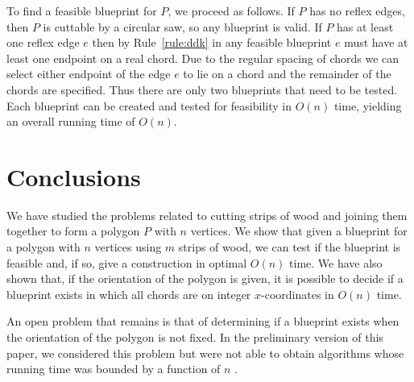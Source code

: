 \documentclass{elsart}
\begin{document}
To find a feasible blueprint for $P$, we proceed as follows.  If $P$
has no reflex edges, then $P$ is cuttable by a circular saw, so any
blueprint is valid.  If $P$ has at least one reflex edge $e$ then by
Rule~\ref{rule:ddk} in any feasible blueprint $e$ must have at least
one endpoint on a real chord.  Due to the regular spacing of chords we
can select either endpoint of the edge $e$ to lie on a chord and the
remainder of the chords are specified.  Thus there are only two
blueprints that need to be tested.  Each blueprint can be created and
tested for feasibility in $O(n)$ time, yielding an overall running
time of $O(n)$.




\section{Conclusions}\label{sect:conclusions}

We have studied the problems related to cutting strips of wood and
joining them together to form a polygon $P$ with $n$ vertices.  We
show that given a blueprint for a polygon with $n$ vertices using $m$
strips of wood, we can test if the blueprint is feasible and, if so,
give a construction in optimal $O(n)$ time. We have also shown that,
if the orientation of the polygon is given, it is possible to decide
if a blueprint exists in which all chords are on integer
$x$-coordinates in $O(n)$ time.

An open problem that remains is that of determining if a blueprint
exists when the orientation of the polygon is not fixed.  In the
preliminary version of this paper, we considered this problem but were
not able to obtain algorithms whose running time was bounded by a
function of $n$ \cite{mm01}.



\end{document}
